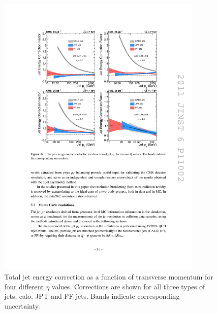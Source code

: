 \begin{figure}[htbp]
	\centering
		\includegraphics[width=0.9\textwidth]{Figures/jet_tot_corr_pt.pdf}
	\caption[Total jet energy correction as a function of transverse momentum for four different $\eta$ values.]{Total jet energy correction as a function of transverse momentum for four different $\eta$ values. Corrections are shown for all three types of jets, calo, JPT and PF jets. Bands indicate corresponding uncertainty.}
	\label{fig:tot_corr_pt}
\end{figure}

